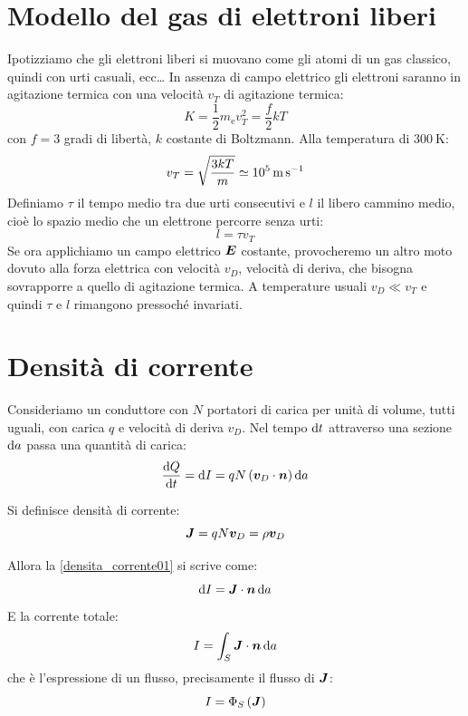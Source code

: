 \section{Modello del gas di elettroni liberi}
Ipotizziamo che gli elettroni liberi si muovano come gli atomi di un gas classico, quindi con urti casuali, ecc\ldots
In assenza di campo elettrico gli elettroni saranno in agitazione termica con una velocità $v_T$ di agitazione termica:
\[K=\frac{1}{2}m_{\mathrm{e}}v_T^2=\frac{f}{2}kT\]
con $f=3$ gradi di libertà, $k$ costante di Boltzmann. Alla temperatura di $\SI{300}{\kelvin}$:
\[v_T=\sqrt{\frac{3kT}{m}}\simeq \SI{E5}{\metre\per\second}\]
Definiamo $\tau$ il tempo medio tra due urti consecutivi e $l$ il libero cammino medio, cioè lo spazio medio che un elettrone percorre senza urti:
\[l = \tau v_T\]
Se ora applichiamo un campo elettrico $\boldsymbol{E}$ costante, provocheremo un altro moto dovuto alla forza elettrica con velocità $v_D$, velocità di deriva, che bisogna sovrapporre a quello di agitazione termica. A temperature usuali $v_D\ll v_T$ e quindi $\tau$ e $l$ rimangono pressoché invariati.
\section{Densità di corrente}
Consideriamo un conduttore con $N$ portatori di carica per unità di volume, tutti uguali, con carica $q$ e velocità di deriva $v_D$. Nel tempo $\mathrm{d} t$ attraverso una sezione $\mathrm{d} a$ passa una quantità di carica:
\begin{equation}
  \frac{\mathrm{d} Q}{\mathrm{d} t}=\mathrm{d} I=qN\left(\boldsymbol{v}_D\cdot \boldsymbol{n}\right)\mathrm{d} a
  \label{densita_corrente01}
\end{equation}
\begin{Def}
  Si definisce densità di corrente:
  \begin{equation}
    \boldsymbol{J}=qN\boldsymbol{v}_D = \rho \boldsymbol{v}_D
  \end{equation}
\end{Def}
Allora la \eqref{densita_corrente01} si scrive come:
\[\mathrm{d} I=\boldsymbol{J}\cdot\boldsymbol{n}\,\mathrm{d} a\]
E la corrente totale:
\begin{equation}
  I=\int_S \boldsymbol{J}\cdot \boldsymbol{n}\,\mathrm{d} a
\end{equation}
che è l'espressione di un flusso, precisamente il flusso di $\boldsymbol{J}$:
\begin{equation}
  I=\Phi_S\left(\boldsymbol{J}\right)
\end{equation}
